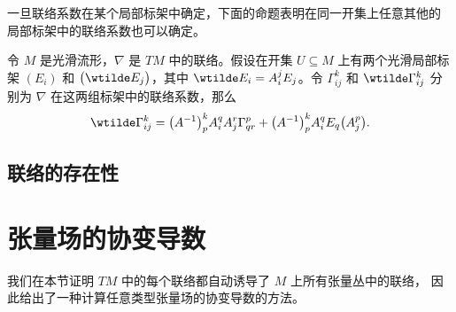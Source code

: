 \documentclass[fontset=none]{Notes}
\begin{document}
一旦联络系数在某个局部标架中确定，下面的命题表明在同一开集上任意其他的
局部标架中的联络系数也可以确定。

\begin{proposition}[联络系数的变换法则]
  令 $M$ 是光滑流形，$\nabla$ 是 $TM$ 中的联络。假设在开集 $U\subseteq M$
  上有两个光滑局部标架 $(E_i)$ 和 $\bigl(\wtilde E_j\bigr)$，其中
  $\wtilde E_i=A_i^jE_j$。令 $\Gamma_{ij}^k$ 和 $\wtilde\Gamma_{ij}^k$
  分别为 $\nabla$ 在这两组标架中的联络系数，那么 
  \begin{equation}
    \wtilde \Gamma_{ij}^k=\bigl(A^{-1}\bigr)_p^kA_i^qA_j^r\Gamma_{qr}^p
    +\bigl(A^{-1}\bigr)_p^kA_i^qE_q\bigl(A_j^p\bigr).
  \end{equation}
\end{proposition}

\subsection{联络的存在性}


\section{张量场的协变导数}

我们在本节证明 $TM$ 中的每个联络都自动诱导了 $M$ 上所有张量丛中的联络，
因此给出了一种计算任意类型张量场的协变导数的方法。
\end{document}
